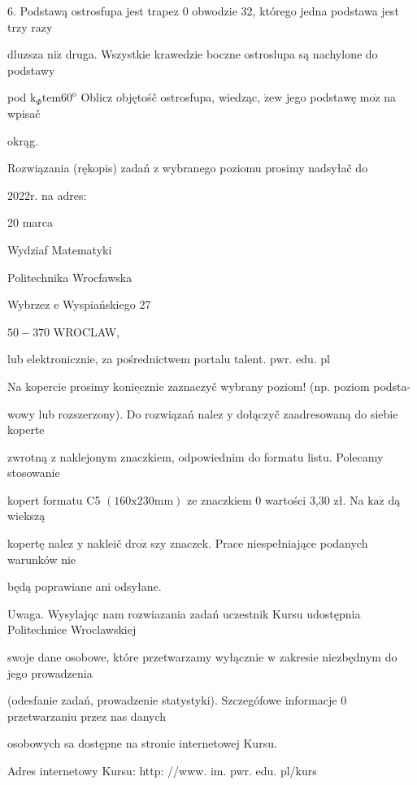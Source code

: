 \documentclass[a4paper,12pt]{article}
\begin{document}
6. Podstawą ostrosfupa jest trapez $0$ obwodzie 32, którego jedna podstawa jest trzy razy

dluzsza $\mathrm{n}\mathrm{i}\dot{\mathrm{z}}$ druga. Wszystkie krawedzie boczne ostroslupa są nachylone do podstawy

pod $\mathrm{k}_{\Phi}\mathrm{t}\mathrm{e}\mathrm{m}60^{\mathrm{o}}$ Oblicz objętośč ostrosfupa, wiedząc, $\dot{\mathrm{z}}\mathrm{e}\mathrm{w}$ jego podstawę $\mathrm{m}\mathrm{o}\dot{\mathrm{z}}$ na wpisač

okrąg.

Rozwiązania (rękopis) zadań z wybranego poziomu prosimy nadsyłač do

2022r. na adres:

20 marca

Wydziaf Matematyki

Politechnika Wrocfawska

Wybrzez $\mathrm{e}$ Wyspiańskiego 27

$50-370$ WROCLAW,

lub elektronicznie, za pośrednictwem portalu talent. $\mathrm{p}\mathrm{w}\mathrm{r}$. edu. pl

Na kopercie prosimy $\underline{\mathrm{k}\mathrm{o}\mathrm{n}\mathrm{i}\mathrm{e}\mathrm{c}\mathrm{z}\mathrm{n}\mathrm{i}\mathrm{e}}$ zaznaczyč wybrany poziom! (np. poziom podsta-

wowy lub rozszerzony). Do rozwiązań nalez $\mathrm{y}$ dołączyč zaadresowaną do siebie koperte

zwrotną $\mathrm{z}$ naklejonym znaczkiem, odpowiednim do formatu listu. Polecamy stosowanie

kopert formatu C5 $(160\mathrm{x}230\mathrm{m}\mathrm{m})$ ze znaczkiem $0$ wartości 3,30 zł. Na $\mathrm{k}\mathrm{a}\dot{\mathrm{z}}$ dą wiekszą

kopertę nalez $\mathrm{y}$ nakleič $\mathrm{d}\mathrm{r}\mathrm{o}\dot{\mathrm{z}}$ szy znaczek. Prace niespełniające podanych warunków nie

będą poprawiane ani odsyłane.

Uwaga. Wysylajqc nam rozwiazania zadań uczestnik Kursu udostępnia Politechnice Wroclawskiej

swoje dane osobowe, które przetwarzamy wyłącznie $\mathrm{w}$ zakresie niezbędnym do jego prowadzenia

(odesfanie zadań, prowadzenie statystyki). Szczegófowe informacje $0$ przetwarzaniu przez nas danych

osobowych sa dostępne na stronie internetowej Kursu.

Adres internetowy Kursu: http: //www. im. pwr. edu. pl/kurs
\end{document}
